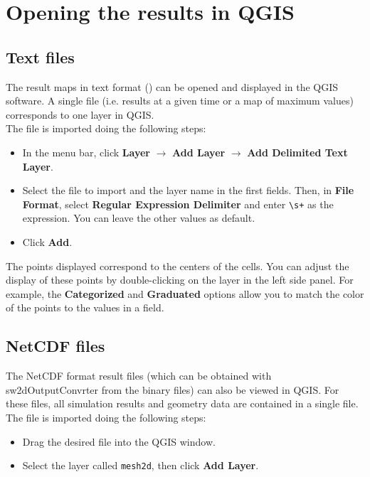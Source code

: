 \section{Opening the results in QGIS}

\subsection{Text files}

The result maps in text format () can be opened and displayed in the QGIS software. A single file (i.e. results at a given time or a map of maximum values) corresponds to one layer in QGIS.\\

The file is imported doing the following steps:

\begin{itemize}
  \item In the menu bar, click \textbf{Layer} $\rightarrow$ \textbf{Add Layer} $\rightarrow$ \textbf{Add Delimited Text Layer}.
  \item Select the file to import and the layer name in the first fields. Then, in \textbf{File Format}, select \textbf{Regular Expression Delimiter} and enter \verb|\s+| as the expression. You can leave the other values as default.
  \item Click \textbf{Add}.
\end{itemize}

The points displayed correspond to the centers of the cells. You can adjust the display of these points by double-clicking on the layer in the left side panel. For example, the \textbf{Categorized} and \textbf{Graduated} options allow you to match the color of the points to the values in a field.

\subsection{NetCDF files}\label{nc_qgis}

The NetCDF format result files (which can be obtained with sw2dOutputConvrter from the binary files) can also be viewed in QGIS. For these files, all simulation results and geometry data are contained in a single file.\\

The file is imported doing the following steps:

\begin{itemize}
  \item Drag the desired file into the QGIS window.
  \item Select the layer called \texttt{mesh2d}, then click \textbf{Add Layer}.
\end{itemize}

